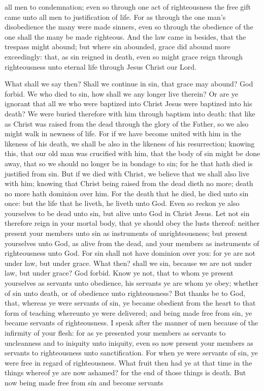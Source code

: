 all men to condemnation; even so through one act of righteousness the free gift came unto all men to justification of life. For as through the one man’s disobedience the many were made sinners, even so through the obedience of the one shall the many be made righteous. And the law came in besides, that the trespass might abound; but where sin abounded, grace did abound more exceedingly: that, as sin reigned in death, even so might grace reign through righteousness unto eternal life through Jesus Christ our Lord. 

What shall we say then? Shall we continue in sin, that grace may abound? God forbid. We who died to sin, how shall we any longer live therein? Or are ye ignorant that all we who were baptized into Christ Jesus were baptized into his death? We were buried therefore with him through baptism into death: that like as Christ was raised from the dead through the glory of the Father, so we also might walk in newness of life. For if we have become united with him in the likeness of his death, we shall be also in the likeness of his resurrection; knowing this, that our old man was crucified with him, that the body of sin might be done away, that so we should no longer be in bondage to sin; for he that hath died is justified from sin. But if we died with Christ, we believe that we shall also live with him; knowing that Christ being raised from the dead dieth no more; death no more hath dominion over him. For the death that he died, he died unto sin once: but the life that he liveth, he liveth unto God. Even so reckon ye also yourselves to be dead unto sin, but alive unto God in Christ Jesus.  Let not sin therefore reign in your mortal body, that ye should obey the lusts thereof: neither present your members unto sin as instruments of unrighteousness; but present yourselves unto God, as alive from the dead, and your members as instruments of righteousness unto God. For sin shall not have dominion over you: for ye are not under law, but under grace.  What then? shall we sin, because we are not under law, but under grace? God forbid. Know ye not, that to whom ye present yourselves as servants unto obedience, his servants ye are whom ye obey; whether of sin unto death, or of obedience unto righteousness? But thanks be to God, that, whereas ye were servants of sin, ye became obedient from the heart to that form of teaching whereunto ye were delivered; and being made free from sin, ye became servants of righteousness. I speak after the manner of men because of the infirmity of your flesh: for as ye presented your members as servants to uncleanness and to iniquity unto iniquity, even so now present your members as servants to righteousness unto sanctification. For when ye were servants of sin, ye were free in regard of righteousness. What fruit then had ye at that time in the things whereof ye are now ashamed? for the end of those things is death. But now being made free from sin and become servants 
